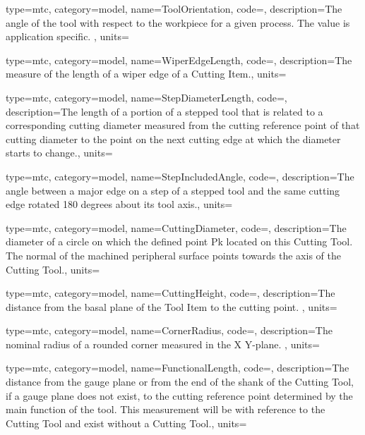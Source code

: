 {
  type=mtc,
  category=model,
  name={ToolOrientation},
  code=,
  description={The angle of the tool with respect to the workpiece for a given process. The value is application specific. },
  units=
}


{
  type=mtc,
  category=model,
  name={WiperEdgeLength},
  code=,
  description={The measure of the length of a wiper edge of a Cutting Item.},
  units=
}


{
  type=mtc,
  category=model,
  name={StepDiameterLength},
  code=,
  description={The length of a portion of a stepped tool that is related to a corresponding cutting diameter measured from the cutting reference point of that cutting diameter to the point on the next cutting edge at which the diameter starts to change.},
  units=
}


{
  type=mtc,
  category=model,
  name={StepIncludedAngle},
  code=,
  description={The angle between a major edge on a step of a stepped tool and the same cutting edge rotated 180 degrees about its tool axis.},
  units=
}


{
  type=mtc,
  category=model,
  name={CuttingDiameter},
  code=,
  description={The diameter of a circle on which the defined point Pk located on this Cutting Tool. The normal of the machined peripheral surface points towards the axis of the Cutting Tool.},
  units=
}


{
  type=mtc,
  category=model,
  name={CuttingHeight},
  code=,
  description={The distance from the basal plane of the Tool Item to the cutting point. },
  units=
}


{
  type=mtc,
  category=model,
  name={CornerRadius},
  code=,
  description={The nominal radius of a rounded corner measured in the X Y-plane. },
  units=
}


{
  type=mtc,
  category=model,
  name={FunctionalLength},
  code=,
  description={The distance from the gauge plane or from the end of the shank of the Cutting Tool, if a gauge plane does not exist, to the cutting reference point determined by the main function of the tool. This measurement will be with reference to the Cutting Tool and \MUSTNOT exist without a Cutting Tool.},
  units=
}


